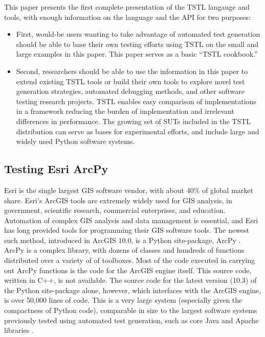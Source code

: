 This paper presents the first complete presentation of the TSTL
langauge and tools, with enough information on the language and the
API for two purposes:

\begin{itemize}
\item First, would-be users wanting to take advantage of automated
  test generation should be able to base their own testing
  efforts using TSTL on the small and large examples in this paper.
  This paper serves as a basic ``TSTL cookbook.''

\item Second, researchers should be able to use the information in this paper to
  extend existing TSTL tools or build their own tools to explore novel
  test generation strategies, automated debugging methods, and other
  software testing research projects.  TSTL enables easy comparison of
  implementations in a framework reducing the burden of implementation
  and irrelevant differences in performance.  The growing set of SUTs
  included in the TSTL distribution can serve as bases for
  experimental efforts, and include large and widely used Python
  software systems.
\end{itemize}

\subsection{Testing Esri ArcPy}


Esri is the single largest GIS software vendor, with about 40\% of
global market share.  Esri's ArcGIS tools are extremely widely used
for GIS analysis, in government, scientific research, commercial
enterprises, and education.  Automation of complex GIS analysis and
data management is essential, and Esri has long provided tools for
programming their GIS software tools.  The newest such method,
introduced in ArcGIS 10.0, is a Python site-package, ArcPy
\cite{ArcPy}.  ArcPy is a complex library, with dozens of classes and
hundreds of functions distributed over a variety of of toolboxes.
Most of the code executed in carrying out ArcPy functions is the code
for the ArcGIS engine itself.  This source code, written in C++, is
not available.  The source code for the latest version (10.3) of the
Python site-package alone, however, which interfaces with the ArcGIS
engine, is over 50,000 lines of code.  This is a very large system
(especially given the compactness of Python code), comparable in size
to the largest software systems previously tested using automated test
generation, such as core Java and Apache libraries
\cite{FA11,Pacheco}.

